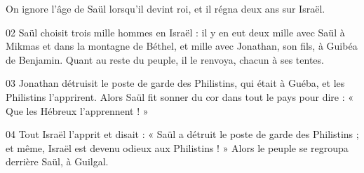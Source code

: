 On ignore l’âge de Saül lorsqu’il devint roi, et il régna deux ans sur Israël.

02 Saül choisit trois mille hommes en Israël : il y en eut deux mille avec Saül à Mikmas et dans la montagne de Béthel, et mille avec Jonathan, son fils, à Guibéa de Benjamin. Quant au reste du peuple, il le renvoya, chacun à ses tentes.

03 Jonathan détruisit le poste de garde des Philistins, qui était à Guéba, et les Philistins l’apprirent. Alors Saül fit sonner du cor dans tout le pays pour dire : « Que les Hébreux l’apprennent ! »

04 Tout Israël l’apprit et disait : « Saül a détruit le poste de garde des Philistins ; et même, Israël est devenu odieux aux Philistins ! » Alors le peuple se regroupa derrière Saül, à Guilgal.
